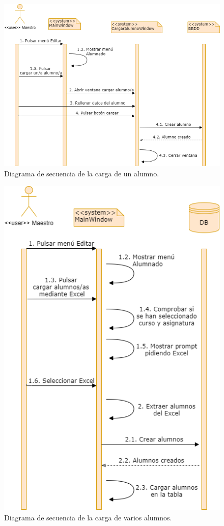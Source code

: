\begin{figure}[H]
\centering\includegraphics[width=0.75\linewidth]{figs/dia_cargaralumno.png}
\caption{Diagrama de secuencia de la carga de un alumno.}
\label{Fig:dia_cargaralumno}
\end{figure}

\begin{figure}[H]
\centering\includegraphics[width=0.5\linewidth]{figs/dia_cargaralumnos.png}
\caption{Diagrama de secuencia de la carga de varios alumnos.}
\label{Fig:dia_cargaralumnos}
\end{figure}

